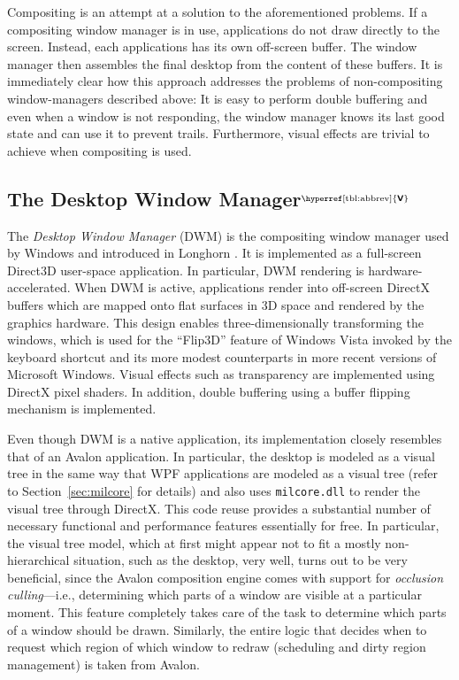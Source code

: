 \documentclass[10pt,twocolumn,a4paper]{article}
\newcommand{\bs}[1]{\textbf{\sffamily #1}}
\newcommand{\winver}[1]{$^{\text{\hyperref[tbl:abbrev]{\bs{#1}}}}$}
\newcommand{\winsubsection}[2]{\subsection[#1]{#1\winver{#2}}}
\begin{document}
			Compositing is an attempt at a solution to the aforementioned
			problems.  If a compositing window manager is in use, applications
			do not draw directly to the screen. Instead, each applications has
			its own off-screen buffer. The
			window manager then assembles the final
			desktop from the content of these buffers. It is immediately clear how this approach addresses the
			problems of non-compositing window-managers described above: It is
			easy to perform double buffering and even when a window is not
			responding, the window manager knows its last good state and can
			use it to prevent trails. Furthermore, visual effects are trivial
			to achieve when compositing is used. \cite{dwmoverview}

		\winsubsection{The Desktop Window Manager}{V}\label{sec:dwm}
			The \emph{Desktop Window Manager} (DWM) is the compositing window
			manager used by Windows and introduced in Longhorn
			\cite{dwmoverview}.  It is implemented as a full-screen Direct3D
			user-space application. In particular, DWM rendering is
			hardware-accelerated. When DWM is active, applications render into
			off-screen DirectX buffers which are mapped onto flat surfaces in
			3D space and rendered by the graphics hardware. This design enables
			three-dimensionally transforming the windows, which is used for the
			\enquote{Flip3D} feature of Windows Vista invoked by the keyboard
			shortcut  and its more modest counterparts in more
			recent versions of Microsoft Windows. Visual effects such as
			transparency are implemented using DirectX pixel shaders. In addition,
			double buffering using a buffer flipping mechanism is implemented.
			\cite{dwmdirectx}

			Even though DWM is a native application, its implementation closely
			resembles that of an Avalon application. In particular, the desktop
			is modeled as a visual tree in the same way that WPF applications
			are modeled as a visual tree (refer to Section~\ref{sec:milcore}
			for details) and also uses \texttt{milcore.dll} to render the
			visual tree through DirectX. This code reuse provides a
			substantial number of necessary functional and performance
			features essentially for free.  In particular, the visual tree
			model, which at first might appear not to fit a mostly
			non-hierarchical situation, such as the desktop, very well,
			turns out to be very beneficial, since the Avalon composition
			engine comes with support for \emph{occlusion culling}---i.e.,
			determining which parts of a window are visible at a particular
			moment. This feature completely takes care of the task to
			determine which parts of a window should be drawn. Similarly, the
			entire logic that decides when to request which region of which window
			to redraw (scheduling and dirty region management) is taken from
			Avalon.
			\cite{dwmwpf}
\end{document}
